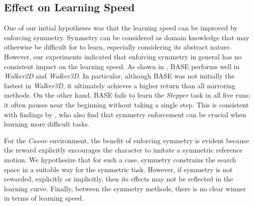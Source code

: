 \subsection{Effect on Learning Speed}

One of our initial hypotheses was that the learning speed can be improved by enforcing symmetry.  
Symmetry can be considered as domain knowledge that may otherwise be difficult for to learn, 
especially considering its abstract nature.  
However, our experiments indicated that enforcing symmetry in general has no consistent impact on the learning speed.
As shown in , BASE performs well in \textit{Walker2D} and \textit{Walker3D}.  
In particular, although BASE was not initially the fastest in \textit{Walker3D}, 
it ultimately achieves a higher return than all mirroring methods.  
On the other hand, BASE fails to learn the \textit{Stepper} task in all five runs;
it often pauses near the beginning without taking a single step.  
This is consistent with findings by \citeauthor{Yu-SIGGRAPH-2018}, 
who also find that symmetry enforcement can be crucial when learning more difficult tasks.

For the \textit{Cassie} environment, the benefit of enforcing symmetry is evident 
because the reward explicitly encourages the character to imitate a symmetric reference motion.  
We hypothesize that for such a case, symmetry constrains the search space in a suitable way 
for the symmetric task. However, if symmetry is not rewarded, explicitly or implicitly, 
then its effects may not be reflected in the learning curve.  Finally, between the symmetry methods, 
there is no clear winner in terms of learning speed.

